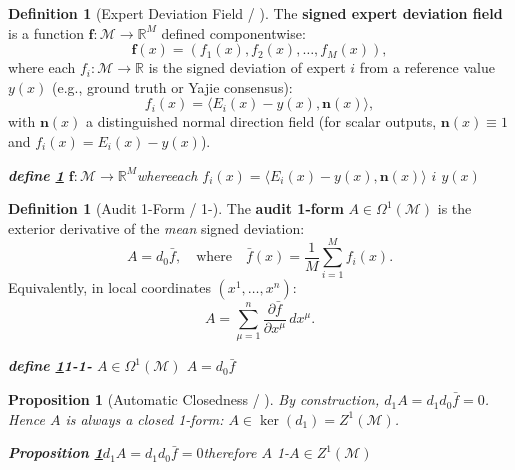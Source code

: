 \documentclass[11pt,a4paper]{article}
\theoremstyle{plain}
\newtheorem{proposition}[theorem]{Proposition}
\theoremstyle{definition}
\newtheorem{definition}[theorem]{Definition}
\newcommand{\R}{\mathbb{R}}
\newcommand{\cM}{\mathcal{M}}
\begin{document}
\begin{definition}[Expert Deviation Field / ]
\label{def:deviation_field}
The \textbf{signed expert deviation field} is a function 
$\mathbf{f}: \cM \to \R^M$ defined componentwise:
\begin{equation}
  \mathbf{f}(x) = (f_1(x), f_2(x), \ldots, f_M(x)),
  \label{eq:f_vector}
\end{equation}
where each $f_i: \cM \to \R$ is the signed deviation of expert $i$ from 
a reference value $y(x)$ (e.g., ground truth or Yajie consensus):
\begin{equation}
  f_i(x) = \langle E_i(x) - y(x), \mathbf{n}(x) \rangle,
  \label{eq:signed_dev}
\end{equation}
with $\mathbf{n}(x)$ a distinguished normal direction field (for scalar 
outputs, $\mathbf{n}(x) \equiv 1$ and $f_i(x) = E_i(x) - y(x)$).
\end{definition}

\bigskip
\noindent
\textit{\textbf{define \ref{def:deviation_field}}\textbf{} $\mathbf{f}: \cM \to \R^M$whereeach $f_i(x) = \langle E_i(x) - y(x), \mathbf{n}(x) \rangle$  $i$  $y(x)$ }

\begin{definition}[Audit 1-Form / 1-]
\label{def:A}
The \textbf{audit 1-form} $A \in \Omega^1(\cM)$ is the exterior derivative 
of the \emph{mean} signed deviation:
\begin{equation}
  A = d_0 \bar{f}, \quad \text{where} \quad 
  \bar{f}(x) = \frac{1}{M} \sum_{i=1}^{M} f_i(x).
  \label{eq:A_def}
\end{equation}
Equivalently, in local coordinates $(x^1, \ldots, x^n)$:
\begin{equation}
  A = \sum_{\mu=1}^{n} \frac{\partial \bar{f}}{\partial x^{\mu}} \, dx^{\mu}.
  \label{eq:A_local}
\end{equation}
\end{definition}

\bigskip
\noindent
\textit{\textbf{define \ref{def:A}1-}\textbf{1-} $A \in \Omega^1(\cM)$ $A = d_0 \bar{f}$}

\begin{proposition}[Automatic Closedness / ]
\label{prop:closed}
By construction, $d_1 A = d_1 d_0 \bar{f} = 0$. Hence $A$ is always a 
\emph{closed} 1-form: $A \in \ker(d_1) = Z^1(\cM)$.
\end{proposition}

\bigskip
\noindent
\textit{\textbf{Proposition \ref{prop:closed}}$d_1 A = d_1 d_0 \bar{f} = 0$therefore $A$ \textbf{}1-$A \in Z^1(\cM)$}
\end{document}
